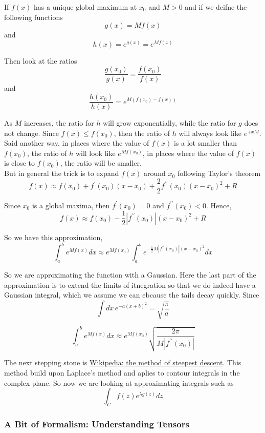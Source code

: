 If $f(x)$ has a unique global maximum at $x_0$ and $M>0$ and if we deifne the following functions
$$
g(x) = Mf(x)
$$
and
$$
h(x) = e^{g(x)} = e^{Mf(x)}
$$

Then look at the ratios
$$
\frac{g(x_0)}{g(x)} = \frac{f(x_0)}{f(x)}
$$
and
$$
\frac{h(x_0)}{h(x)} = e^{M(f(x_0) - f(x))}
$$

As $M$ increases, the ratio for $h$ will grow exponentially, while the ratio for $g$ does not change.
Since $f(x) \leq f(x_0)$, then the ratio of $h$ will always look like $e^{+{x}M}$.
Said another way, in places where the value of $f(x)$ is a lot smaller than $f(x_0)$, the ratio of $h$ will look like
$e^{Mf(x_0)}$, in places where the value of $f(x)$ is close to $f(x_0)$, the ratio will be smaller.
\\

But in general the trick is to expand $f(x)$ around $x_0$ following Taylor's theorem
$$
f(x) \approx
    f(x_0) + f^{\prime} (x_0) (x-x_0) + \frac{2}{2} f^{\prime\prime} (x_0) (x-x_0)^2 + R
$$

Since $x_0$ is a global maxima, then $f^{\prime} (x_0) = 0$ and $f^{\prime\prime} (x_0) < 0$.
Hence,
$$
f(x) \approx
    f(x_0) - \frac{1}{2} |f^{\prime\prime} (x_0)| (x-x_0)^2 + R
$$

So we have this approximation,
$$
\int_{a}^{b} e^{Mf(x)} dx \approx
    e^{Mf(x_0)} \int_{a}^{b} e^{- \frac{1}{2} M |f^{\prime\prime} (x_0)| (x-x_0)^2} dx
$$

So we are approximating the function with a Gaussian.
Here the last part of the approximation is to extend the limits of itnegration so that we do indeed have a Gaussian integral,
which we assume we can ebcause the tails decay quickly.
Since
$$
\int dx\, e^{-a(x+b)^2} = \sqrt{ \frac{\pi}{a} }
$$

$$
\int_{a}^{b} e^{Mf(x)} dx \approx
    e^{Mf(x_0)} \sqrt{ \frac{2\pi}{M |f^{\prime\prime} (x_0)|} }
$$

The next stepping stone is
\href{https://en.wikipedia.org/wiki/Method_of_steepest_descent}{Wikipedia: the method of steepest descent}.
This method build upon Laplace's method and aplies to contour integrals in the complex plane.
So now we are looking at approximating integrals such as
$$
\int_{C} f(z) e^{\lambda g(z)} dz
$$


\subsubsection{A Bit of Formalism: Understanding Tensors}

